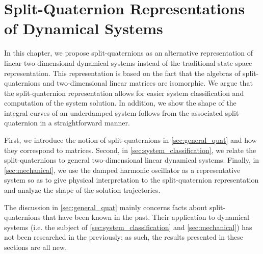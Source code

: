 \chapter{Split-Quaternion Representations of Dynamical Systems}
\label{chap:quaternion}
In this chapter, we propose split-quaternions as an alternative representation of linear two-dimensional dynamical systems instead of the traditional state space representation. This representation is based on the fact that the algebras of split-quaternions and two-dimensional linear matrices are isomorphic. We argue that the split-quaternion representation allows for easier system classification and computation of the system solution. In addition, we show the shape of the integral curves of an underdamped system follows from the associated split-quaternion in a straightforward manner.

First, we introduce the notion of split-quaternions in \cref{sec:general_quat} and how they correspond to matrices. Second, in \cref{sec:system_classification}, we relate the split-quaternions to general two-dimensional linear dynamical systems. Finally, in \cref{sec:mechanical}, we use the damped harmonic oscillator as a representative system so as to give physical interpretation to the split-quaternion representation and analyze the shape of the solution trajectories. 

The discussion in \cref{sec:general_quat} mainly concerns facts about split-quaternions that have been known in the past. Their application to dynamical systems (i.e. the subject of \cref{sec:system_classification} and \cref{sec:mechanical}) has not been researched in the previously; as such, the results presented in these sections are all new.






